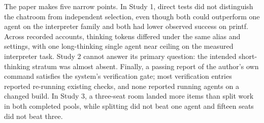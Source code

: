 The paper makes five narrow points. In Study 1, direct tests did not distinguish the chatroom from independent selection, even though both could outperform one agent on the interpreter family and both had lower observed success on printf. Across recorded accounts, thinking tokens differed under the same alias and settings, with one long-thinking single agent near ceiling on the measured interpreter task. Study 2 cannot answer its primary question: the intended short-thinking stratum was almost absent. Finally, a passing report of the author's own command satisfies the system's verification gate; most verification entries reported re-running existing checks, and none reported running agents on a changed build. In Study 3, a three-seat room landed more items than split work in both completed pools, while splitting did not beat one agent and fifteen seats did not beat three.
